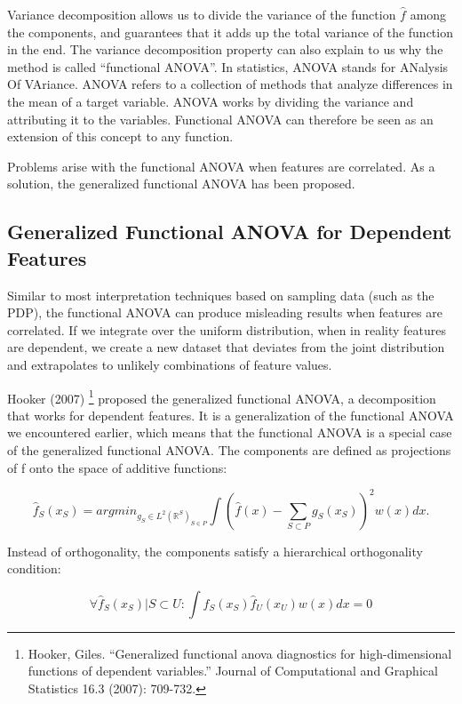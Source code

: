 \documentclass[
  11pt,
]{scrbook}
\begin{document}
Variance decomposition allows us to divide the variance of the function \(\hat{f}\) among the components, and guarantees that it adds up the total variance of the function in the end.
The variance decomposition property can also explain to us why the method is called ``functional ANOVA''.
In statistics, ANOVA stands for ANalysis Of VAriance.
ANOVA refers to a collection of methods that analyze differences in the mean of a target variable.
ANOVA works by dividing the variance and attributing it to the variables.
Functional ANOVA can therefore be seen as an extension of this concept to any function.

Problems arise with the functional ANOVA when features are correlated.
As a solution, the generalized functional ANOVA has been proposed.

\hypertarget{generalized-functional-anova-for-dependent-features}{%
\subsection{Generalized Functional ANOVA for Dependent Features}\label{generalized-functional-anova-for-dependent-features}}

Similar to most interpretation techniques based on sampling data (such as the PDP), the functional ANOVA can produce misleading results when features are correlated.
If we integrate over the uniform distribution, when in reality features are dependent, we create a new dataset that deviates from the joint distribution and extrapolates to unlikely combinations of feature values.

Hooker (2007) \footnote{Hooker, Giles. ``Generalized functional anova diagnostics for high-dimensional functions of dependent variables.'' Journal of Computational and Graphical Statistics 16.3 (2007): 709-732.} proposed the generalized functional ANOVA, a decomposition that works for dependent features.
It is a generalization of the functional ANOVA we encountered earlier, which means that the functional ANOVA is a special case of the generalized functional ANOVA.
The components are defined as projections of f onto the space of additive functions:

\[\hat{f}_S(x_S) = argmin_{g_S \in L^2(\mathbb{R}^S)_{S \in P}} \int \left(\hat{f}(x)  - \sum_{S \subset P} g_S(x_S)\right)^2 w(x)dx.\]

Instead of orthogonality, the components satisfy a hierarchical orthogonality condition:

\[\forall \hat{f}_S(x_S)| S \subset U: \int \hat{f}_S(x_S) \hat{f}_U(x_U) w(x)dx = 0\]
\end{document}
